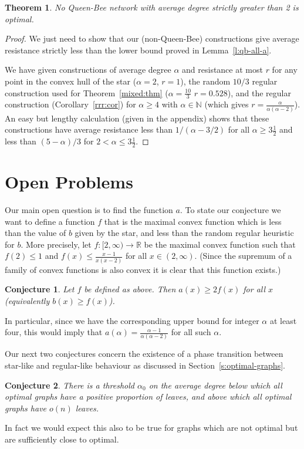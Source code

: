 \documentclass[11pt]{article}
\newtheorem{theorem}{Theorem}
\newtheorem{conj}{Conjecture}
\theoremstyle{remark}
\def\a{\alpha}
\def\N{\mathbb{N}}
\def\R{\mathbb{R}}
\begin{document}
\begin{theorem}\label{t:qb-never-best}
No Queen-Bee network with average degree strictly greater than 2 is optimal.
\end{theorem}
\begin{proof}
  We just need to show that our (non-Queen-Bee) constructions give
  average resistance strictly less than the lower bound proved in
  Lemma~\ref{l:qb-all-a}.

  We have given constructions of average degree $\a$ and resistance at
  most $r$ for any point in the convex hull of the star ($\a=2$,
  $r=1$), the random $10/3$ regular construction used for
  Theorem~\ref{mixed:thm} ($\a=\tfrac{10}{3}$ $r=0.528$), and the
  regular construction (Corollary~\ref{rrr:cor}) for $\a\ge 4$ with
  $\a\in \N$ (which gives $r=\tfrac{\a}{\a(\a-2)}$). An easy but
  lengthy calculation (given in the appendix) shows that these
  constructions have average resistance less than $1/(\a-3/2)$ for all
  $\a\ge 3\frac12$ and less than $(5-\a)/3$ for $2<\a\le 3\frac12$.
\end{proof}

\section{Open Problems}\label{s:open-questions} Our main open
question is to find the function $a$. To state our conjecture we want
to define a function $f$ that is the maximal convex function which is
less than the value of $b$ given by the star, and less than the random
regular heuristic for $b$. More precisely, let
$f\colon[2,\infty)\to\R$ be the maximal convex function such that
$f(2)\le1$ and $f(x)\le \frac{x-1}{x(x-2)}$ for all
$x\in(2,\infty)$. (Since the supremum of a family of convex functions
is also convex it is clear that this function exists.)

\begin{conj}
  Let $f$ be defined as above.  Then $a(x)\ge 2f(x)$ for all $x$
  (equivalently $b(x)\ge f(x)$).
\end{conj}
\noindent%
In particular, since we have the corresponding upper bound for integer
$\alpha$ at least four, this would imply that
$a(\alpha)=\frac{\a-1}{\a(\a-2)}$ for all such $\alpha$.

Our next two conjectures concern the existence of a phase transition
between star-like and regular-like behaviour as discussed in
Section~\ref{s:optimal-graphs}. 
\begin{conj}
  There is a threshold $\a_0$ on the average degree below which all
  optimal graphs have a positive proportion of leaves, and
  above which all optimal graphs have $o(n)$ leaves.
\end{conj}
\noindent%
In fact we would expect this also to be true for graphs which are not
optimal but are sufficiently close to optimal.  
\end{document}
